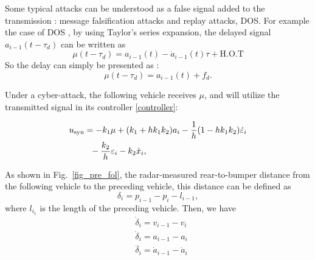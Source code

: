 \documentclass[conference]{IEEEtran}
\newtheorem{remark}{\it Remark}%
\begin{document}
    Some typical attacks can be understood as a false signal added to the transmission :  
message falsification attacks and replay attacks, DOS. For example the case of DOS , by using Taylor's series expansion, the delayed signal $a_{i-1}(t-\tau_d )$ can be written as
\begin{equation}\mu(t-\tau_d ) = a_{i-1}(t) -\dot{a}_{i-1}(t)\tau+ \text{H.O.T}\end{equation}
So the delay can simply be presented as :
\begin{equation}\mu(t-\tau_d ) = a_{i-1}(t) + f_d. \end{equation}

Under a cyber-attack, the following vehicle receives $\mu$, and 
will utilize the transmitted signal in its controller \eqref{controller}: 

\begin{align}\label{control_uc}
        u_{\text{syn}}&=-k_{1}\mu+(k_{1}+h k_{1}k_{2}){a}_{i}-\frac{1}{h}(1-h k_{1}k_{2})\dot{\varepsilon}_{i}\notag\\
        &~~-\frac{k_{2}}{h}\varepsilon_{i}-k_{2}\dot{x}_{i},
\end{align}


As shown in Fig.~\ref{fig_pre_fol}, the radar-measured rear-to-bumper distance from the following vehicle to the preceding vehicle, this distance can be defined as
\begin{equation} \label{distance_error}
    \delta_{i}=p_{i-1}-p_{i}-l_{i-1},
\end{equation}
where $l_{i_1}$ is the length of the preceding vehicle. Then, we have 
\begin{equation} \label{error_state}
    \begin{aligned}
        & \dot{\delta}_i={v}_{i-1}-{v}_i \\
        & \ddot{\delta}_i={a}_{i-1}-{a}_i \\
        & \dddot{\delta_{i}}=\dot{a}_{i-1}-\dot{a}_i
    \end{aligned}
\end{equation}
\end{document}
